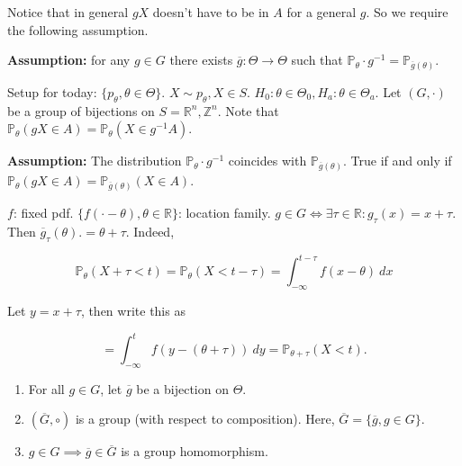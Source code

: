 Notice that in general \(gX\) doesn't have to be in \(A\) for a general \(g\). So we require the following assumption.

\textbf{Assumption:} for any \(g \in G\) there exists \(\overline{g}: \Theta \to \Theta\) such that \(\mathbb{P}_\theta \cdot g^{-1} = \mathbb{P}_{\overline{g}(\theta)}\).

Setup for today: \(\{p_\theta, \theta \in \Theta\}\). \(X \sim p_\theta, X \in S\). \(H_0: \theta \in \Theta_0, H_a: \theta \in \Theta_a\).  Let \((G, \cdot)\) be a group of bijections on \(S = \mathbb{R}^n, \mathbb{Z}^n\). Note that \(\mathbb{P}_\theta (gX \in A) = \mathbb{P}_\theta (X \in g^{-1}A)\). 

\textbf{Assumption:} The distribution \(\mathbb{P}_\theta \cdot g^{-1}\) coincides with \(\mathbb{P}_{\overline{g}(\theta)}\). True if and only if \(\mathbb{P}_\theta(gX \in A) = \mathbb{P}_{\overline{g}(\theta)} (X \in A)\). 

\begin{example}

\(f\): fixed pdf. \(\{f(\cdot - \theta), \theta \in \mathbb{R}\}\): location family. \(g \in G \iff \exists \tau \in \mathbb{R}: g_\tau(x) = x + \tau\). Then \(\overline{g}_\tau(\theta). = \theta + \tau\). Indeed, 

\[
\mathbb{P}_\theta(X + \tau < t) = \mathbb{P}_\theta(X < t - \tau) = \int_{-\infty}^{t - \tau} f(x - \theta) \ dx
\]

Let \(y = x + \tau\), then write this as 

\[
= \int_{-\infty}^{t} f(y - (\theta + \tau)) \ dy = \mathbb{P}_{\theta + \tau} (X < t).
\]

\end{example}

\begin{theorem}

\begin{enumerate}

\item For all \(g \in G\), let \(\overline{g}\) be a bijection on \(\Theta\). 

\item \((\overline{G}, \circ)\) is a group (with respect to composition). Here, \(\overline{G} = \{\overline{g}, g \in G\}\). 

\item \(g \in G \implies \overline{g} \in \overline{G}\) is a group homomorphism.

\end{enumerate}

\end{theorem}

